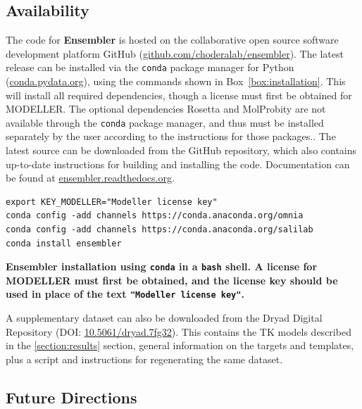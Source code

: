 \documentclass[10pt,letterpaper]{article}
\begin{document}
\subsection*{Availability}

The code for {\bf Ensembler} is hosted on the collaborative open source software development platform GitHub (\href{http://github.com/choderalab/ensembler}{github.com/choderalab/ensembler}).
The latest release can be installed via the {\tt conda} package manager for Python (\href{http://conda.pydata.org}{conda.pydata.org}), using the commands shown in Box~\ref{box:installation}.
This will install all required dependencies, though a license must first be obtained for MODELLER.
The optional dependencies Rosetta and MolProbity are not available through the {\tt conda} package manager, and thus must be installed separately by the user according to the instructions for those packages..
The latest source can be downloaded from the GitHub repository, which also contains up-to-date instructions for building and installing the code.
Documentation can be found at \href{http://ensembler.readthedocs.org/en/latest/}{ensembler.readthedocs.org}.

\begin{codebox}[h]
\begin{adjustwidth}{-2.25in}{0in}
\footnotesize
\begin{Verbatim}[frame=single]
export KEY_MODELLER="Modeller license key"
conda config -add channels https://conda.anaconda.org/omnia
conda config -add channels https://conda.anaconda.org/salilab
conda install ensembler
\end{Verbatim}
\caption{{\bf Ensembler installation using {\tt conda} in a {\tt bash} shell. A license for MODELLER must first be obtained, and the license key should be used in place of the text {\tt "Modeller license key"}.}
}
\label{box:installation}
\end{adjustwidth}
\end{codebox}

A supplementary dataset can also be downloaded from the Dryad Digital Repository (DOI: \href{https://dx.doi.org/10.5061/dryad.7fg32}{10.5061/dryad.7fg32}).
This contains the TK models described in the \ref{section:results} section, general information on the targets and templates, plus a script and instructions for regenerating the same dataset.

\subsection*{Future Directions}
\end{document}

